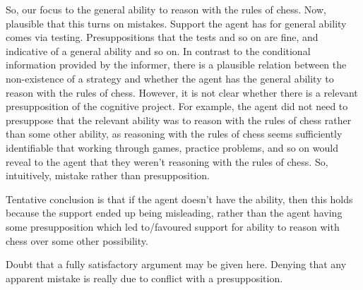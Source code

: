\documentclass[10pt]{article}
\begin{document}
\begin{note}
  So, our focus to the general ability to reason with the rules of chess.
  Now, plausible that this turns on mistakes.
  Support the agent has for general ability comes via testing.
  Presuppositions that the tests and so on are fine, and indicative of a general ability and so on.
  In contrast to the conditional information provided by the informer, there is a plausible relation between the non-existence of a strategy and whether the agent has the general ability to reason with the rules of chess.
  However, it is not clear whether there is a relevant presupposition of the cognitive project.
  For example, the agent did not need to presuppose that the relevant ability was to reason with the rules of chess rather than some other ability, as reasoning with the rules of chess seems sufficiently identifiable that working through games, practice problems, and so on would reveal to the agent that they weren't reasoning with the rules of chess.
  So, intuitively, mistake rather than presupposition.


  Tentative conclusion is that if the agent doesn't have the ability, then this holds because the support ended up being misleading, rather than the agent having some presupposition which led to/favoured support for ability to reason with chess over some other possibility.

  Doubt that a fully satisfactory argument may be given here.
  Denying that any apparent mistake is really due to conflict with a presupposition.
\end{note}
\end{document}

